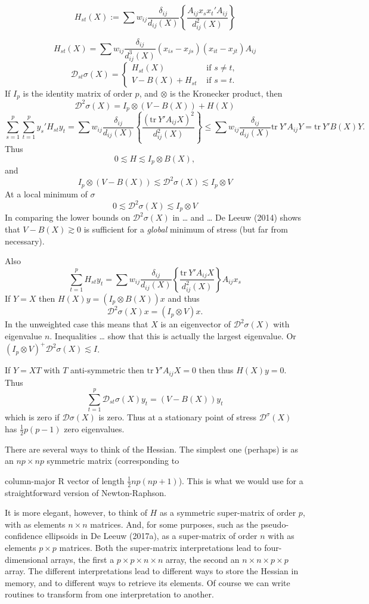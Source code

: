 \documentclass[
  12pt,
]{article}
\begin{document}
\[
H_{st}(X):=\sum w_{ij}\frac{\delta_{ij}}{d_{ij}(X)}\left\{\frac{A_{ij}x_sx_t'A_{ij}}{d_{ij}^2(X)}\right\}
\]

\[
H_{st}(X)=\sum   w_{ij}\frac{\delta_{ij}}{d_{ij}^3(X)}(x_{is}-x_{js})(x_{it}-x_{jt})A_{ij}
\]
\[
\mathcal{D}_{st}\sigma(X)=\begin{cases}H_{st}(X)&\text{ if }s\not= t,\\
V-B(X)+H_{st}&\text{ if }s= t.
\end{cases}
\]
If \(I_p\) is the identity matrix of order \(p\), and \(\otimes\) is the
Kronecker product, then \[
\mathcal{D}^2\sigma(X)=I_p\otimes(V - B(X))+ H(X)
\] \[
\sum_{s=1}^p\sum_{t=1}^p y_s'H_{st}y_t=\sum w_{ij}\frac{\delta_{ij}}{d_{ij}(X)}\left\{\frac{(\text{tr} \ Y'A_{ij}X)^2}{d_{ij}^2(X)}\right\}\leq\sum w_{ij}\frac{\delta_{ij}}{d_{ij}(X)}\text{tr}\ Y'A_{ij}Y=\text{tr}\ Y'B(X)Y.
\]
Thus
\[
0\lesssim H\lesssim I_p\otimes B(X),
\]
and
\[
I_p\otimes (V-B(X))\lesssim\mathcal{D}^2\sigma(X)\lesssim I_p\otimes V
\]
At a local minimum of \(\sigma\)
\[
0\lesssim\mathcal{D}^2\sigma(X)\lesssim I_p\otimes V
\]
In comparing the lower bounds on \(\mathcal{D}^2\sigma(X)\) in \ldots{} and
\ldots{} De Leeuw (2014) shows that \(V-B(X)\gtrsim 0\) is sufficient for a
\emph{global} minimum of stress (but far from necessary).

Also \[
\sum_{t=1}^p H_{st}y_t=\sum w_{ij}\frac{\delta_{ij}}{d_{ij}(X)}\left\{\frac{\text{tr}\ Y'A_{ij}X }{d_{ij}^2(X)}\right\}A_{ij}x_s
\] If \(Y=X\) then \(H(X)y=(I_p\otimes B(X))x\) and thus
\[\mathcal{D}^2\sigma(X)x=(I_p\otimes V)x.\] In the unweighted case this
means that \(X\) is an eigenvector of \(\mathcal{D}^2\sigma(X)\) with
eigenvalue \(n\). Inequalities \ldots{} show that this is actually the largest
eigenvalue. Or \((I_p\otimes V)^+\mathcal{D}^2\sigma(X)\lesssim I\).

If \(Y=XT\) with \(T\) anti-symmetric then \(\text{tr}\ Y'A_{ij}X=0\) then
thus \(H(X)y=0\). Thus \[
\sum_{t=1}^p\mathcal{D}_{st}\sigma(X)y_t=(V-B(X))y_t
\] which is zero if \(\mathcal{D}\sigma(X)\) is zero. Thus at a stationary
point of stress \(\mathcal{D}^\sigma(X)\) has \(\frac12p(p-1)\) zero
eigenvalues.

There are several ways to think of the Hessian. The simplest one
(perhaps) is as an \(np\times np\) symmetric matrix (corresponding to

column-major R vector of length \(\frac12 np(np+1)\)). This is what we
would use for a straightforward version of Newton-Raphson.

It is more elegant, however, to think of \(H\) as a symmetric super-matrix
of order \(p\), with as elements \(n\times n\) matrices. And, for some
purposes, such as the pseudo-confidence ellipsoids in De Leeuw (2017a), as
a super-matrix of order \(n\) with as elements \(p\times p\) matrices. Both
the super-matrix interpretations lead to four-dimensional arrays, the
first a \(p\times p\times n\times n\) array, the second an
\(n\times n\times p\times p\) array. The different interpretations lead to
different ways to store the Hessian in memory, and to different ways to
retrieve its elements. Of course we can write routines to transform from
one interpretation to another.
\end{document}

